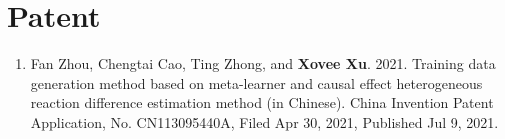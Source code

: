 \section*{Patent}

\begin{enumerate}
    \item Fan Zhou, Chengtai Cao, Ting Zhong, and \textbf{Xovee Xu}. 2021. Training data generation method based on meta-learner and causal effect heterogeneous reaction difference estimation method (in Chinese). China Invention Patent Application, No. CN113095440A, Filed Apr 30, 2021, Published Jul 9, 2021. 
\end{enumerate}